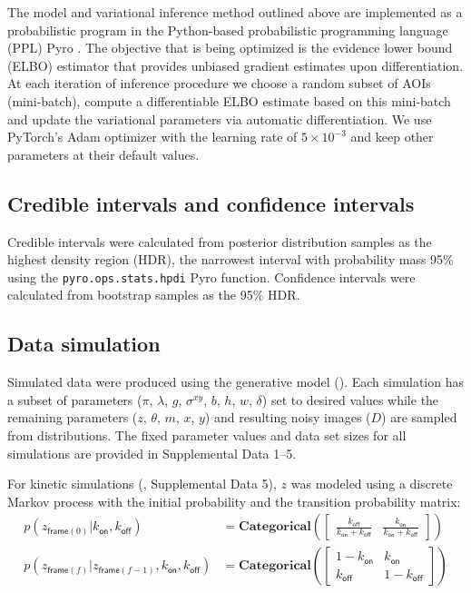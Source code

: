 The model and variational inference method outlined above are implemented as a probabilistic program in the Python-based probabilistic programming language (PPL) Pyro \citep{Foerster2018-kd,Bingham2019-qy,Obermeyer2019-xt}. The objective that is being optimized is the evidence lower bound (ELBO) estimator that provides unbiased gradient estimates upon differentiation. At each iteration of inference procedure we choose a random subset of AOIs (mini-batch), compute a differentiable ELBO estimate based on this mini-batch and update the variational parameters via automatic differentiation. We use PyTorch's Adam optimizer \citep{Kingma2014-cz} with the learning rate of $5\times 10^{-3}$ and keep other parameters at their default values. 


\subsection{Credible intervals and confidence intervals}

Credible intervals were calculated from posterior distribution samples as the highest density region (HDR), the narrowest interval with probability mass 95\% using the \texttt{pyro.ops.stats.hpdi} Pyro function. Confidence intervals were calculated from bootstrap samples as the 95\% HDR.

\subsection{Data simulation}

Simulated data were produced using the generative model (). Each simulation has a subset of parameters ($\pi$, $\lambda$, $g$, $\sigma^{xy}$, $b$, $h$, $w$, $\delta$) set to desired values while  the remaining parameters ($z$, $\theta$, $m$, $x$, $y$) and resulting noisy images ($D$) are sampled from distributions. The fixed parameter values and data set sizes for all simulations are provided in Supplemental Data 1--5.

For kinetic simulations (, Supplemental Data 5), $z$ was modeled using a discrete Markov process with the initial probability and the transition probability matrix:
%
\begin{subequations}
\begin{align}
    p(z_{\mathsf{frame}(0)} | k_\mathsf{on}, k_\mathsf{off}) &= \mathbf{Categorical} \left( \begin{bmatrix} \frac{k_\mathsf{off}}{k_\mathsf{on} + k_\mathsf{off}} & \frac{k_\mathsf{on}}{k_\mathsf{on} + k_\mathsf{off}} \end{bmatrix} \right) \\
    p(z_{\mathsf{frame}(f)} | z_{\mathsf{frame}(f-1)}, k_\mathsf{on}, k_\mathsf{off}) &= \mathbf{Categorical} \left( \begin{bmatrix} 1 - k_\mathsf{on} & k_\mathsf{on} \\ k_\mathsf{off} & 1 - k_\mathsf{off} \end{bmatrix} \right)
\end{align}
\end{subequations}

